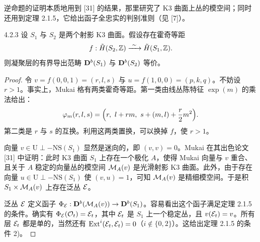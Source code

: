 
逆命题的证明本质地用到 [31] 的结果，那里研究了 K3 曲面上丛的模空间；同时还用到定理 2.1.5，它给出函子全忠实的判别准则（见 [7]）。

\begin{proposition}{4.2.3}
设 $S_1$ 与 $S_2$ 是两个射影 K3 曲面。假设存在霍奇等距
\begin{equation*}
f:\tilde H(S_2,\mathbb{Z})\xrightarrow{\ \sim\ }\tilde H(S_1,\mathbb{Z}).
\end{equation*}
则凝聚层的有界导出范畴 $\mathbf{D}^{b}(S_1)$ 与 $\mathbf{D}^{b}(S_2)$ 等价。
\end{proposition}

\begin{proof}
令 $v=f(0,0,1)=(r,l,s)$ 与 $u=f(1,0,0)=(p,k,q)$。不妨设 $r>1$。事实上，Mukai 格有两类霍奇等距。第一类由线丛陈特征 $\exp(m)$ 的乘法给出：
\begin{equation*}
\varphi_m(r,l,s)=\Bigl(r,\ l+rm,\ s+(m,l)+\frac{r}{2}m^2\Bigr).
\end{equation*}
第二类是 $r$ 与 $s$ 的互换。利用这两类置换，可以换掉 $f$，使 $r>1$。


向量 $v\in\mathrm{U}\perp-\mathrm{NS}(S_1)$ 显然是迷向的，即 $(v,v)=0$。Mukai 在其出色论文 [31] 中证明：此时 K3 曲面 $S_1$ 上存在一个极化 $A$，使得 Mukai 向量与 $v$ 重合、且关于 $A$ 稳定的向量丛的模空间 $\mathcal{M}_A(v)$ 是光滑射影 K3 曲面。此外，由于存在向量 $u\in\mathrm{U}\perp-\mathrm{NS}(S_1)$ 使 $(v,u)=1$，可知 $\mathcal{M}_A(v)$ 是精细模空间。于是积 $S_1\times\mathcal{M}_A(v)$ 上存在泛丛 $\mathcal{E}$。


泛丛 $\mathcal{E}$ 定义函子 $\Phi_{\mathcal{E}}:\mathbf{D}^{b}(\mathcal{M}_A(v))\to\mathbf{D}^{b}(S_1)$。容易看出这个函子满足定理 2.1.5 的条件。确实有 $\Phi_{\mathcal{E}}(\mathcal{O}_t)=\mathcal{E}_t$，其中 $\mathcal{E}_t$ 是 $S_1$ 上一个稳定丛，且 $v(\mathcal{E}_t)=v$。所有层 $\mathcal{E}_t$ 都是单的，当然还有 $\operatorname{Ext}^i(\mathcal{E}_t,\mathcal{E}_t)=0$（$i\notin\{0,2\}$）。这给出定理 2.1.5 的条件 2)。


\end{proof}
